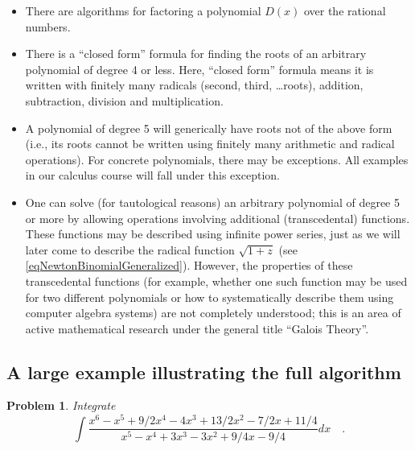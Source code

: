 \documentclass[12pt]{book}
\newtheorem{problem}{Problem}[section]
\begin{document}
\begin{itemize}
\item There are algorithms for factoring a polynomial $D(x)$ over the rational numbers.
\item There is a ``closed form'' formula for finding the roots of an arbitrary polynomial of degree 4 or less. Here, ``closed form'' formula means it is written with finitely many radicals (second, third, \dots roots), addition, subtraction, division and multiplication.
\item A polynomial of degree 5 will generically have roots not of the above form (i.e., its roots cannot be written using finitely many arithmetic and radical operations). For concrete polynomials, there may be exceptions. All examples in our calculus course will fall under this exception.
\item One can solve (for tautological reasons) an arbitrary polynomial of degree 5 or more by allowing operations involving additional (transcedental) functions. These functions may be described using infinite power series, just as we will later come to describe the radical function $\sqrt{1+z}$ (see \eqref{eqNewtonBinomialGeneralized}). However, the properties of these transcedental functions (for example, whether one such function may be used for two different polynomials or how to systematically describe them using computer algebra systems) are not completely understood; this is an area of active mathematical research under the general title ``Galois Theory''.
\end{itemize}

\subsection{A large example illustrating the full algorithm }
\begin{problem}
Integrate 
\[
\int \frac{x^{6}-x^{5}+9/2x^{4}-4x^{3}+13/2x^{2}-7/2x+11/4}{x^{5}-x^{4}+3x^{3}-3x^{2}+9/4x-9/4} dx\quad .
\]
\end{problem}
\end{document}
